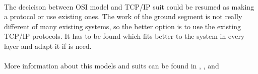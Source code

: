 \paragraph{}
The decicison between OSI model and TCP/IP suit could be resumed as making a protocol or use existing ones. The work of the ground segment is not really different of many existing systems, so the better option is to use the existing TCP/IP protocols. It has to be found which fits better to the system in every layer and adapt it if is need.
\paragraph{}
More information about this models and suits can be found in \cite{OSI}, \cite{TCPIP}, \cite{NetBEUI} and \cite{IPX}
